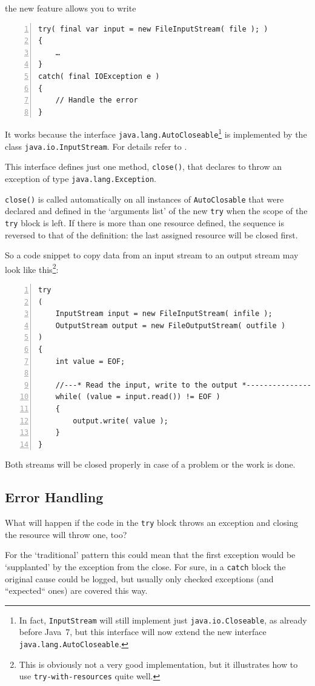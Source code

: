 \documentclass[12pt,a4paper,titlepage, parskip=half, headsepline, footsepline, cleardoubleplain]{scrbook}
\begin{document}
the new feature allows you to write

\begin{lstlisting}[numbers=left]
try( final var input = new FileInputStream( file ); )
{
    …
}
catch( final IOException e )
{
    // Handle the error
}
\end{lstlisting}

It works because the interface \lstinline|java.lang.AutoCloseable|\footnote{In fact, \lstinline|InputStream| will still implement just \lstinline|java.io.Closeable|, as already before Java~7, but this interface will now extend the new interface \lstinline|java.lang.AutoCloseable|.} is implemented by the class \lstinline|java.io.InputStream|. For details refer to \autocite{ORACLE_DOC_AUTOCLOSEABLE_INTERFACE}.

This interface defines just one method, \lstinline|close()|, that declares to throw an exception of type \lstinline|java.lang.Exception|.

\lstinline|close()| is called automatically on all instances of \lstinline|AutoClosable| that were declared and defined in the ‘arguments list’ of the new \lstinline|try| when the scope of the \lstinline|try| block is left. If there is more than one resource defined, the sequence is reversed to that of the definition: the last assigned resource will be closed first.

So a code snippet to copy data from an input stream to an output stream may look like this\footnote{This is obviously not a very good implementation, but it illustrates how to use \lstinline|try-with-resources| quite well.}:
\begin{lstlisting}[numbers=left]
try
( 
    InputStream input = new FileInputStream( infile );
    OutputStream output = new FileOutputStream( outfile ) 
)
{
	int value = EOF;
	
    //---* Read the input, write to the output *---------------------
    while( (value = input.read()) != EOF )
    {
        output.write( value );
    }
}
\end{lstlisting}
Both streams will be closed properly in case of a problem or the work is done.

\subsection{Error Handling}
What will happen if the code in the \lstinline|try| block throws an exception and closing the resource will throw one, too?

For the ‘traditional’ pattern this could mean that the first exception would be ‘supplanted’ by the exception from the close. For sure, in a \lstinline|catch| block the original cause could be logged, but usually only checked exceptions (and “expected“ ones) are covered this way.
\end{document}
